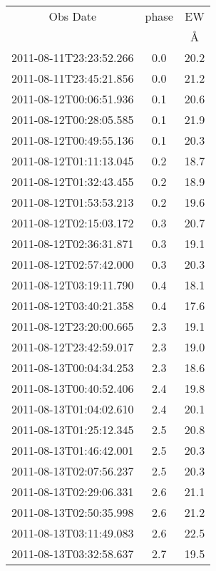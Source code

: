 \begin{table}
\begin{tabular}{ccc}
\hline \hline
Obs Date & phase & EW \\
 & $\mathrm{}$ & \AA \\
\hline
2011-08-11T23:23:52.266 & 0.0 & 20.2 \\
2011-08-11T23:45:21.856 & 0.0 & 21.2 \\
2011-08-12T00:06:51.936 & 0.1 & 20.6 \\
2011-08-12T00:28:05.585 & 0.1 & 21.9 \\
2011-08-12T00:49:55.136 & 0.1 & 20.3 \\
2011-08-12T01:11:13.045 & 0.2 & 18.7 \\
2011-08-12T01:32:43.455 & 0.2 & 18.9 \\
2011-08-12T01:53:53.213 & 0.2 & 19.6 \\
2011-08-12T02:15:03.172 & 0.3 & 20.7 \\
2011-08-12T02:36:31.871 & 0.3 & 19.1 \\
2011-08-12T02:57:42.000 & 0.3 & 20.3 \\
2011-08-12T03:19:11.790 & 0.4 & 18.1 \\
2011-08-12T03:40:21.358 & 0.4 & 17.6 \\
2011-08-12T23:20:00.665 & 2.3 & 19.1 \\
2011-08-12T23:42:59.017 & 2.3 & 19.0 \\
2011-08-13T00:04:34.253 & 2.3 & 18.6 \\
2011-08-13T00:40:52.406 & 2.4 & 19.8 \\
2011-08-13T01:04:02.610 & 2.4 & 20.1 \\
2011-08-13T01:25:12.345 & 2.5 & 20.8 \\
2011-08-13T01:46:42.001 & 2.5 & 20.3 \\
2011-08-13T02:07:56.237 & 2.5 & 20.3 \\
2011-08-13T02:29:06.331 & 2.6 & 21.1 \\
2011-08-13T02:50:35.998 & 2.6 & 21.2 \\
2011-08-13T03:11:49.083 & 2.6 & 22.5 \\
2011-08-13T03:32:58.637 & 2.7 & 19.5 \\
\hline
\end{tabular}
\end{table}
